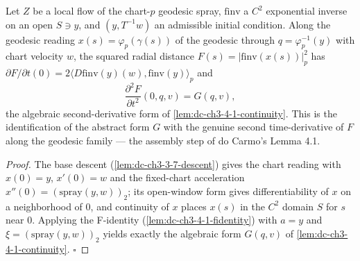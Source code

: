 \begin{lemma}
  \label{lem:dc-ch3-4-1-flowreading}
  \leanok
  Let $Z$ be a local flow of the chart-$p$ geodesic spray, $\mathrm{finv}$ a $C^2$ exponential
  inverse on an open $S\ni y$, and $(y,T^{-1}w)$ an admissible initial condition. Along the
  geodesic reading $x(s)=\varphi_p(\gamma(s))$ of the geodesic through $q=\varphi_p^{-1}(y)$
  with chart velocity $w$, the squared radial distance $F(s)=|\mathrm{finv}(x(s))|_p^2$ has
  $\partial F/\partial t(0)=2\langle D\mathrm{finv}(y)(w),\mathrm{finv}(y)\rangle_p$ and
  $$\frac{\partial^2 F}{\partial t^2}(0,q,v)=G(q,v),$$
  the algebraic second-derivative form of \cref{lem:dc-ch3-4-1-continuity}. This is the
  identification of the abstract form $G$ with the genuine second time-derivative of $F$ along
  the geodesic family — the assembly step of do Carmo's Lemma 4.1.
\end{lemma}
\begin{proof}
  \leanok
  The base descent (\cref{lem:dc-ch3-3-7-descent}) gives the chart reading with $x(0)=y$,
  $x'(0)=w$ and the fixed-chart acceleration $x''(0)=(\mathrm{spray}(y,w))_2$; its open-window
  form gives differentiability of $x$ on a neighborhood of $0$, and continuity of $x$ places
  $x(s)$ in the $C^2$ domain $S$ for $s$ near $0$. Applying the F-identity
  (\cref{lem:dc-ch3-4-1-fidentity}) with $a=y$ and $\xi=(\mathrm{spray}(y,w))_2$ yields exactly
  the algebraic form $G(q,v)$ of \cref{lem:dc-ch3-4-1-continuity}. $\square$
\end{proof}

